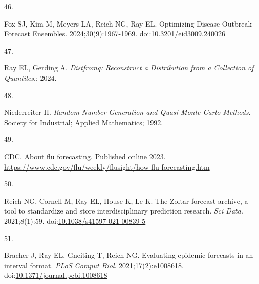 \documentclass[
]{article}
\newlength{\cslhangindent}
\newlength{\csllabelwidth}
\newenvironment{CSLReferences}[2] %
 {\begin{list}{}{%
  \setlength{\itemindent}{0pt}
  \setlength{\leftmargin}{0pt}
  \setlength{\parsep}{0pt}
  \ifodd #1
   \setlength{\leftmargin}{\cslhangindent}
   \setlength{\itemindent}{-1\cslhangindent}
  \fi
  \setlength{\itemsep}{#2\baselineskip}}}
 {\end{list}}
\newcommand{\CSLLeftMargin}[1]{\parbox[t]{\csllabelwidth}{\strut#1\strut}}
\newcommand{\CSLRightInline}[1]{\parbox[t]{\linewidth - \csllabelwidth}{\strut#1\strut}}
\begin{document}
\begin{CSLReferences}{0}{1}
\CSLLeftMargin{46. }%
\CSLRightInline{Fox SJ, Kim M, Meyers LA, Reich NG, Ray EL. Optimizing
{Disease} {Outbreak} {Forecast} {Ensembles}. 2024;30(9):1967-1969.
doi:\href{https://doi.org/10.3201/eid3009.240026}{10.3201/eid3009.240026}}

\CSLLeftMargin{47. }%
\CSLRightInline{Ray EL, Gerding A. \emph{Distfromq: Reconstruct a
Distribution from a Collection of Quantiles}.; 2024.}

\CSLLeftMargin{48. }%
\CSLRightInline{Niederreiter H. \emph{Random Number Generation and
Quasi-Monte Carlo Methods}. Society for Industrial; Applied Mathematics;
1992.}

\CSLLeftMargin{49. }%
\CSLRightInline{CDC. About flu forecasting. Published online 2023.
\url{https://www.cdc.gov/flu/weekly/flusight/how-flu-forecasting.htm}}

\CSLLeftMargin{50. }%
\CSLRightInline{Reich NG, Cornell M, Ray EL, House K, Le K. The {Zoltar}
forecast archive, a tool to standardize and store interdisciplinary
prediction research. \emph{Sci Data}. 2021;8(1):59.
doi:\href{https://doi.org/10.1038/s41597-021-00839-5}{10.1038/s41597-021-00839-5}}

\CSLLeftMargin{51. }%
\CSLRightInline{Bracher J, Ray EL, Gneiting T, Reich NG. Evaluating
epidemic forecasts in an interval format. \emph{PLoS Comput Biol}.
2021;17(2):e1008618.
doi:\href{https://doi.org/10.1371/journal.pcbi.1008618}{10.1371/journal.pcbi.1008618}}

\end{CSLReferences}
\end{document}
